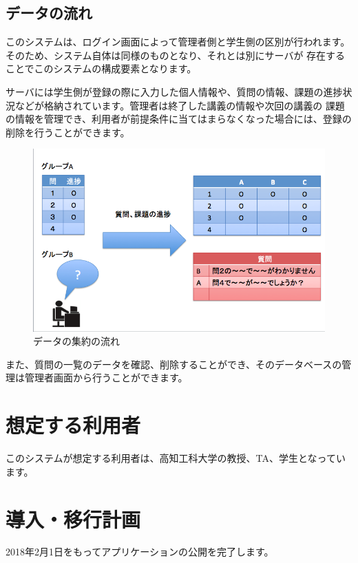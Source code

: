 \documentclass[a4j,titlepage]{ujarticle}
\begin{document}
\subsection{データの流れ}
このシステムは、ログイン画面によって管理者側と学生側の区別が行われます。そのため、システム自体は同様のものとなり、それとは別にサーバが %
存在することでこのシステムの構成要素となります。

サーバには学生側が登録の際に入力した個人情報や、質問の情報、課題の進捗状況などが格納されています。管理者は終了した講義の情報や次回の講義の
課題の情報を管理でき、利用者が前提条件に当てはまらなくなった場合には、登録の削除を行うことができます。
\begin{figure}[h]

\centering
   \includegraphics[width=13cm]{ui.png}
  \caption{データの集約の流れ}
\end{figure}

また、質問の一覧のデータを確認、削除することができ、そのデータベースの管理は管理者画面から行うことができます。

\section{想定する利用者}
このシステムが想定する利用者は、高知工科大学の教授、TA、学生となっています。 %

\section{導入・移行計画}
2018年2月1日をもってアプリケーションの公開を完了します。
\end{document}
